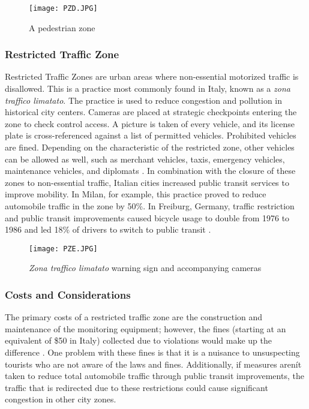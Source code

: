 \begin{figure}[h]
\centering
\texttt{[image: PZD.JPG]}
\caption[A pedestrian zone]{A pedestrian zone}\label{fig:PZD}
\end{figure}

\subsubsection{Restricted Traffic Zone}

Restricted Traffic Zones are urban areas where non-essential motorized traffic is disallowed. This is a practice most commonly found in Italy, known as a \emph{zona traffico limatato}. The practice is used to reduce congestion and pollution in historical city centers. Cameras are placed at strategic checkpoints entering the zone to check control access. A picture is taken of every vehicle, and its license plate is cross-referenced against a list of permitted vehicles. Prohibited vehicles are fined. Depending on the characteristic of the restricted zone, other vehicles can be allowed as well, such as merchant vehicles, taxis, emergency vehicles, maintenance vehicles, and diplomats \cite{PZ1}. In combination with the closure of these zones to non-essential traffic, Italian cities increased public transit services to improve mobility. In Milan, for example, this practice proved to reduce automobile traffic in the zone by 50\%. In Freiburg, Germany, traffic restriction and public transit improvements caused bicycle usage to double from 1976 to 1986 and led 18\% of drivers to switch to public transit \cite{PZ2}. 
 
\begin{figure}[h]
\centering
\texttt{[image: PZE.JPG]}
\caption[\emph{Zona traffico limatato} warning sign and accompanying cameras]{\emph{Zona traffico limatato} warning sign and accompanying cameras}\label{fig:PZE}
\end{figure}

\subsubsection{Costs and Considerations}

The primary costs of a restricted traffic zone are the construction and maintenance of the monitoring equipment; however, the fines (starting at an equivalent of \$50 in Italy) collected due to violations would make up the difference \cite{PZ1}. One problem with these fines is that it is a nuisance to unsuspecting tourists who are not aware of the laws and fines. Additionally, if measures arenít taken to reduce total automobile traffic through public transit improvements, the traffic that is redirected due to these restrictions could cause significant congestion in other city zones.

